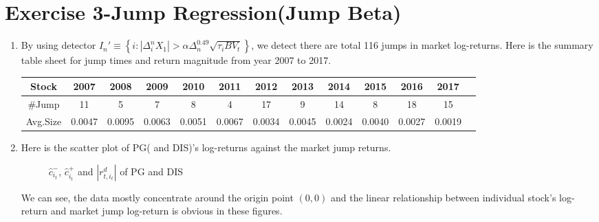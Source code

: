 \documentclass[12pt,letterpaper]{article}
\begin{document}
\section*{Exercise 3-Jump Regression(Jump Beta)}
\begin{enumerate}[label=\textbf{(\Alph*)}]
\item By using detector $I_n' \equiv \left\{i:|\Delta_i^nX_1|>\alpha\Delta_n^{0.49}\sqrt{\tau_iBV_t} \right\}$, we detect there are total 116 jumps in market log-returns. Here is the summary table sheet for jump times and return magnitude from year 2007 to 2017.

\begin{table}[ht]
	\footnotesize
		\centering %
		\begin{tabular}{cc cccccccccc c} %
			\hline\hline %
			 Stock&2007&2008&2009&2010&2011&2012&2013&2014&2015&2016&2017\\  %
			\hline %
			\#Jump & 11	&5&	7	&8	&4&	17&	9&	14&	8&	18	&15 \\ 
			
			Avg.Size & 0.0047& 0.0095&0.0063 &0.0051& 0.0067& 0.0034 &0.0045& 0.0024& 0.0040 &0.0027 &0.0019 \\ %
			\hline %
		\end{tabular}
\end{table}

\item Here is the scatter plot of PG( and DIS)'s log-returns against the market jump returns.
 \begin{figure}[H]
	\centering
	\caption{ $\hat{c}_{i_t}^-$, $\hat{c}_{i_t}^+$ and $|r_{t,i_t}^d|$ of PG and DIS}
\end{figure}
We can see, the data mostly concentrate around the origin point $(0,0)$ and the linear relationship between individual stock's log-return and market jump log-return is obvious in these figures.





\end{enumerate}
\end{document}
